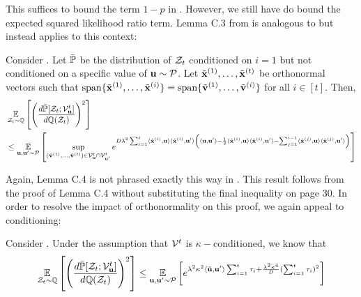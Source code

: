 This suffices to bound the term \(1-p\) in .
However, we still have do bound the expected squared likelihood ratio term.
Lemma C.3 from \cite{simchowitz2017gap} is analogous to  but instead applies to this context:
\begin{importedlemma}
    \label{lem:simchowitz-generic-chisquared-testing}
    Consider .
    Let \(\bar{{\mathbb P}}\) be the distribution of \({\mathcal Z}_t\) conditioned on \(i=1\) but not conditioned on a specific value of \(\boldsymbol{\mathrm{u}}\sim{\mathcal P}\).
    Let \(\tilde{\boldsymbol{\mathrm{x}}}^{(1)},\ldots,\tilde{\boldsymbol{\mathrm{x}}}^{(t)}\) be orthonormal vectors such that \(\text{span}\{\tilde{\boldsymbol{\mathrm{x}}}^{(1)},\ldots,\tilde{\boldsymbol{\mathrm{x}}}^{(i)}\} = \text{span}\{\tilde{\boldsymbol{\mathrm{v}}}^{(1)},\ldots,\tilde{\boldsymbol{\mathrm{v}}}^{(i)}\}\) for all \(i\in[t]\).
    Then,
    \begin{align*}
        &\operatorname*{\mathbb{E}}_{{\mathcal Z}_t\sim{\mathbb Q}} \left[ \left( \frac{d\bar{{\mathbb P}}[{\mathcal Z}_t;{\mathcal V}_{\boldsymbol{\mathrm{u}}}^t]}{d{\mathbb Q}({\mathcal Z}_t)} \right)^2 \right] \\
        &\leq
        \operatorname*{\mathbb{E}}_{\boldsymbol{\mathrm{u}},\boldsymbol{\mathrm{u}}'\sim{\mathcal P}}\left[
        \sup_{(\tilde{\boldsymbol{\mathrm{v}}}^{(1)},\ldots,\tilde{\boldsymbol{\mathrm{v}}}^{(t)}) \in {\mathcal V}_{\boldsymbol{\mathrm{u}}}^t\cap{\mathcal V}_{\boldsymbol{\mathrm{u}}'}^t}
        e^{D \lambda^2
            \sum_{i=1}^t
            \langle\tilde{\boldsymbol{\mathrm{x}}}^{(i)},\boldsymbol{\mathrm{u}}\rangle
            \langle\tilde{\boldsymbol{\mathrm{x}}}^{(i)},\boldsymbol{\mathrm{u}}'\rangle
            \left(
                \langle\boldsymbol{\mathrm{u}},\boldsymbol{\mathrm{u}}'\rangle
                -
                \frac12
                \langle\tilde{\boldsymbol{\mathrm{x}}}^{(i)},\boldsymbol{\mathrm{u}}\rangle
                \langle\tilde{\boldsymbol{\mathrm{x}}}^{(i)},\boldsymbol{\mathrm{u}}'\rangle
                -
                \sum_{j=1}^{i-1}
                \langle\tilde{\boldsymbol{\mathrm{x}}}^{(j)},\boldsymbol{\mathrm{u}}\rangle
                \langle\tilde{\boldsymbol{\mathrm{x}}}^{(j)},\boldsymbol{\mathrm{u}}'\rangle
            \right)
        }\right]
    \end{align*}
\end{importedlemma}
Again, Lemma C.4 is not phrased exactly this way in \cite{simchowitz2017gap}.
This result follows from the proof of Lemma C.4 without substituting the final inequality on page 30.
In order to resolve the impact of orthonormality on this proof, we again appeal to conditioning:
\begin{lemma}
    \label{lem:conditioning-gives-chisquared-ratio}
    Consider .
    Under the assumption that \({\mathcal V}^t\) is \(\kappa-\)conditioned, we know that
    \[
        \operatorname*{\mathbb{E}}_{{\mathcal Z}_t\sim{\mathbb Q}} \left[\left(\frac{d\bar{{\mathbb P}}[{\mathcal Z}_t;{\mathcal V}_{\boldsymbol{\mathrm{u}}}^t]}{d{\mathbb Q}({\mathcal Z}_t)}\right)^2\right]
        \leq \operatorname*{\mathbb{E}}_{\boldsymbol{\mathrm{u}},\boldsymbol{\mathrm{u}}'\sim{\mathcal P}}\left[
            e^{
                \lambda^2 \kappa^2 \langle\tilde{\boldsymbol{\mathrm{u}}},\boldsymbol{\mathrm{u}}'\rangle \sum_{i=1}^t \tau_i
                +
                \frac{\lambda^2 \kappa^4}{D} (\sum_{i=1}^t \tau_i)^2
        }\right]
    \]
\end{lemma}
